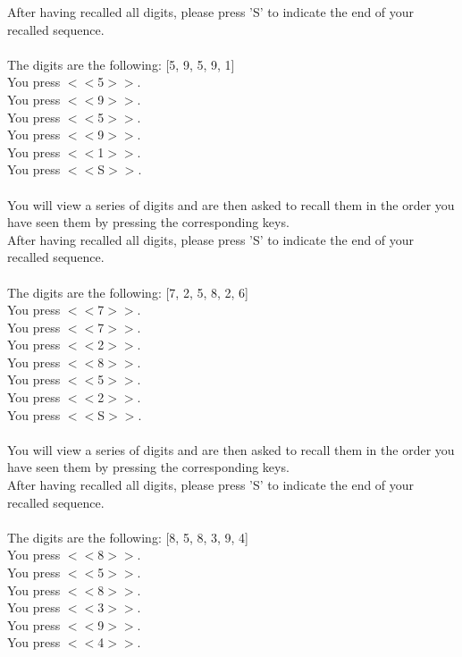 \documentclass[pdflatex,sn-nature]{sn-jnl}%
\theoremstyle{thmstyleone}%
\theoremstyle{thmstyletwo}%
\theoremstyle{thmstylethree}%
\begin{document}
After having recalled all digits, please press 'S' to indicate the end of your recalled sequence. $~$\\ 
 $~$\\ 
The digits are the following: [5, 9, 5, 9, 1] $~$\\ 
You press $<<$5$>>$. $~$\\ 
You press $<<$9$>>$. $~$\\ 
You press $<<$5$>>$. $~$\\ 
You press $<<$9$>>$. $~$\\ 
You press $<<$1$>>$. $~$\\ 
You press $<<$S$>>$.  $~$\\ 
 $~$\\ 
You will view a series of digits and are then asked to recall them in the order you have seen them by pressing the corresponding keys. $~$\\ 
After having recalled all digits, please press 'S' to indicate the end of your recalled sequence. $~$\\ 
 $~$\\ 
The digits are the following: [7, 2, 5, 8, 2, 6] $~$\\ 
You press $<<$7$>>$. $~$\\ 
You press $<<$7$>>$. $~$\\ 
You press $<<$2$>>$. $~$\\ 
You press $<<$8$>>$. $~$\\ 
You press $<<$5$>>$. $~$\\ 
You press $<<$2$>>$. $~$\\ 
You press $<<$S$>>$.  $~$\\ 
 $~$\\ 
You will view a series of digits and are then asked to recall them in the order you have seen them by pressing the corresponding keys. $~$\\ 
After having recalled all digits, please press 'S' to indicate the end of your recalled sequence. $~$\\ 
 $~$\\ 
The digits are the following: [8, 5, 8, 3, 9, 4] $~$\\ 
You press $<<$8$>>$. $~$\\ 
You press $<<$5$>>$. $~$\\ 
You press $<<$8$>>$. $~$\\ 
You press $<<$3$>>$. $~$\\ 
You press $<<$9$>>$. $~$\\ 
You press $<<$4$>>$. $~$\\ 
\end{document}
